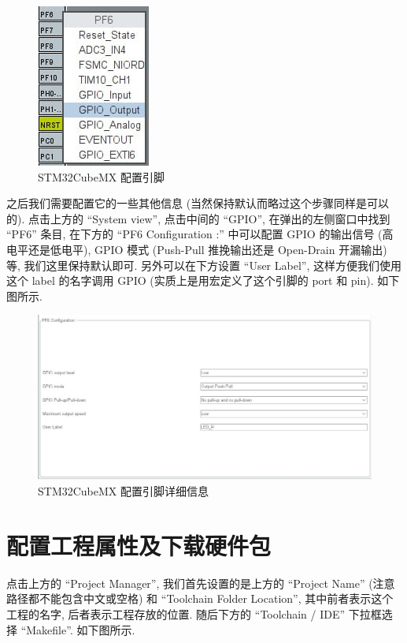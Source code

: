 \begin{figure}[H]
    \centering
    \includegraphics{images/1-newproj-setpin.jpg}
    \caption{STM32CubeMX 配置引脚}
\end{figure}

之后我们需要配置它的一些其他信息 (当然保持默认而略过这个步骤同样是可以的). 点击上方的 ``System view'', 点击中间的 ``GPIO'', 在弹出的左侧窗口中找到 ``PF6'' 条目, 在下方的 ``PF6 Configuration :'' 中可以配置 GPIO 的输出信号 (高电平还是低电平), GPIO 模式 (Push-Pull 推挽输出还是 Open-Drain 开漏输出) 等, 我们这里保持默认即可. 另外可以在下方设置 ``User Label'', 这样方便我们使用这个 label 的名字调用 GPIO (实质上是用宏定义了这个引脚的 port 和 pin). 如下图所示.

\begin{figure}[H]
    \centering
    \includegraphics[width=\textwidth]{images/1-newproj-configpin.jpg}
    \caption{STM32CubeMX 配置引脚详细信息}
\end{figure}

\section{配置工程属性及下载硬件包}
点击上方的 ``Project Manager'', 我们首先设置的是上方的 ``Project Name'' (注意路径都不能包含中文或空格) 和 ``Toolchain Folder Location'', 其中前者表示这个工程的名字, 后者表示工程存放的位置. 随后下方的 ``Toolchain / IDE'' 下拉框选择 ``Makefile''. 如下图所示.

